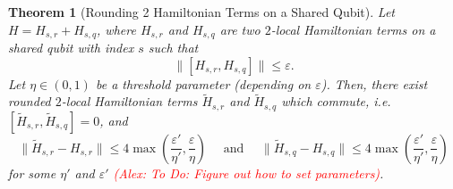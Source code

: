 \documentclass[11pt]{article}
\theoremstyle{plain}
\newtheorem{theorem}{Theorem}[section]
\newcommand{\eps}{\varepsilon}
\newcommand{\AlexNote}[1]{\textcolor{red}{(Alex: #1)}}
\newcommand{\AlexNote}[1]{}
\begin{document}
\begin{theorem}[Rounding 2 Hamiltonian Terms on a Shared Qubit]
Let $H=H_{s, r}+H_{s, q}$, where $H_{s, r}$ and $H_{s, q}$ are two $2$-local Hamiltonian terms on a shared qubit with index $s$ such that
$$
\|[H_{s, r}, H_{s, q}]\| \leq \eps.
$$
Let $\eta \in (0,1)$ be a threshold parameter (depending on $\eps$). Then, there exist rounded $2$-local Hamiltonian terms $\tilde H_{s, r}$ and $\tilde H_{s, q}$ which commute, i.e. $[\tilde H_{s, r},\tilde H_{s, q}] = 0$, and
\begin{equation}
\| \tilde H_{s, r}  - H_{s, r}\| \leq 4 \max\left(\frac{\eps'}{\eta'},\frac{\eps}{\eta} \right)  \quad \text{ and } \quad
\| \tilde H_{s, q}  - H_{s, q}\| \leq 4 \max\left(\frac{\eps'}{\eta'},\frac{\eps}{\eta} \right) 
\end{equation}
for some $\eta'$ and $\eps'$ \AlexNote{To Do: Figure out how to set parameters}.
\end{theorem}
\end{document}
